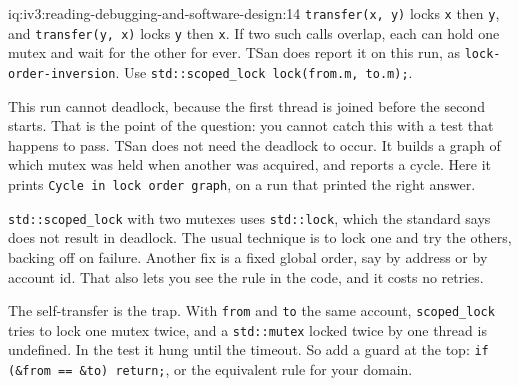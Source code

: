 \begin{solution}{iq:iv3:reading-debugging-and-software-design:14}
\texttt{transfer(x, y)} locks \texttt{x} then \texttt{y}, and \texttt{transfer(y, x)} locks \texttt{y} then \texttt{x}. If two such calls overlap, each can hold one mutex and wait for the other for ever. TSan does report it on this run, as \texttt{lock-order-inversion}. Use \texttt{std::scoped\_lock lock(from.m, to.m);}.

This run cannot deadlock, because the first thread is joined before the second starts. That is the point of the question: you cannot catch this with a test that happens to pass. TSan does not need the deadlock to occur. It builds a graph of which mutex was held when another was acquired, and reports a cycle. Here it prints \texttt{Cycle in lock order graph}, on a run that printed the right answer.

\texttt{std::scoped\_lock} with two mutexes uses \texttt{std::lock}, which the standard says does not result in deadlock. The usual technique is to lock one and try the others, backing off on failure. Another fix is a fixed global order, say by address or by account id. That also lets you see the rule in the code, and it costs no retries.

The self-transfer is the trap. With \texttt{from} and \texttt{to} the same account, \texttt{scoped\_lock} tries to lock one mutex twice, and a \texttt{std::mutex} locked twice by one thread is undefined. In the test it hung until the timeout. So add a guard at the top: \texttt{if (\&from == \&to) return;}, or the equivalent rule for your domain.


\end{solution}

